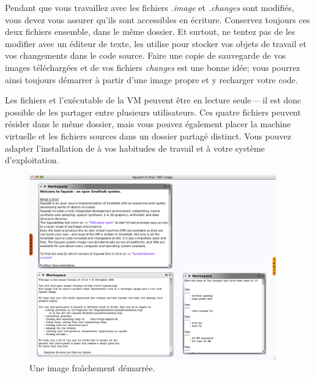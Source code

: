 \documentclass[a4paper,10pt,twoside]{book}
\begin{document}
Pendant que vous travaillez avec \sq les fichiers \emph{.image} et \emph{.changes} sont modifiés, vous devez vous assurer qu'ils sont accessibles en écriture.
Conservez toujours ces deux fichiers ensemble, \cad dans le même dossier.
Et surtout, ne tentez pas de les modifier avec un éditeur de texte, \sq les utilise pour stocker vos objets de travail et vos changements dans le code source.
Faire une copie de sauvegarde de vos images téléchargées et de vos
fichiers \emph{changes} est une bonne id\'ee; vous pourrez ainsi
toujours démarrer à partir d'une image propre et y recharger votre code.

Les fichiers  et l'exécutable de la VM peuvent être
en lecture seule\,---\,il est donc possible de les partager entre plusieurs utilisateurs.
Ces quatre fichiers peuvent résider dans le même dossier, mais vous pouvez également placer la machine virtuelle et les fichiers sources dans un dossier partagé distinct.
Vous pouvez adapter l'installation de \sq à vos habitudes de travail
et \`a votre système d'exploitation.


\begin{figure}[htb]
\centerline {\includegraphics[width=0.95\textwidth]{startup}}
\caption{Une image \sq fra\^{\i}chement d\'emarr\'ee.\label{fig:startup}}
\end{figure}
\end{document}
